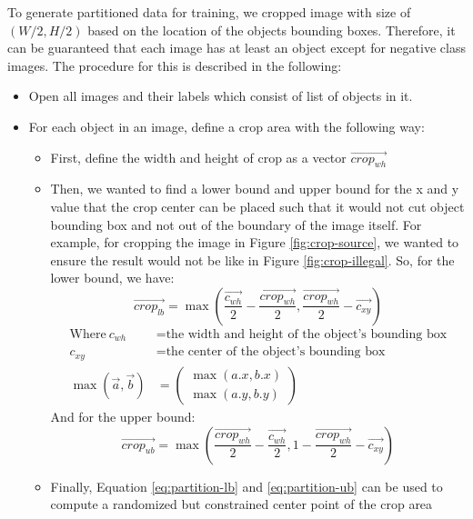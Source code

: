 To generate partitioned data for training, we cropped image with size of $(W/2,H/2)$
based on the location of the objects bounding boxes. Therefore, it can be guaranteed that each image has at least
an object except for negative class images.
The procedure for this is described in the following:
\begin{itemize}[topsep=0pt]
  \item Open all images and their labels which consist of list of objects in it.
  \item For each object in an image, define a crop area with the following way:
  \begin{itemize}
    \item First, define the width and height of crop as a vector $\overrightarrow{crop_{wh}}$
    \item Then, we wanted to find a lower bound and upper bound for the x and y value that the crop center can be placed such that
    it would not cut object bounding box and not out of the boundary of the image itself. For example, for cropping the 
    image in Figure \ref{fig:crop-source}, we wanted to ensure the result would not be like in Figure \ref{fig:crop-illegal}.
    So, for the lower bound, we have:
      \begin{equation}
        \overrightarrow{crop_{lb}} = \max\left (\frac{\overrightarrow{c_{wh}}}{2} - \frac{\overrightarrow{crop_{wh}}}{2}, \frac{\overrightarrow{crop_{wh}}}{2} - \overrightarrow{c_{xy}}\right )
        \label{eq:partition-lb}
      \end{equation}
      \begin{align*}
        \text{Where}~c_{wh} &= \text{the width and height of the object's bounding box}\\
        c_{xy} &= \text{the center of the object's bounding box}\\
        \max(\vec{a},\vec{b}) &= \begin{pmatrix}\max(a.x,b.x) \\ \max(a.y,b.y)\end{pmatrix}  
      \end{align*}
    And for the upper bound:
      \begin{equation}
        \overrightarrow{crop_{ub}} = \max\left (\frac{\overrightarrow{crop_{wh}}}{2} - \frac{\overrightarrow{c_{wh}}}{2}  , 1 - \frac{\overrightarrow{crop_{wh}}}{2} - \overrightarrow{c_{xy}}\right )
        \label{eq:partition-ub}
      \end{equation}
    \item Finally, Equation \ref{eq:partition-lb} and \ref{eq:partition-ub} can be used to compute a randomized but constrained center point of the crop area

\end{itemize}
\end{itemize}
